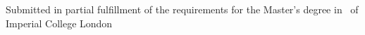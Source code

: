 \begin{titlepage}
\vfill %
Submitted in partial fulfillment of the requirements for the Master's degree in
\degreetype~of Imperial College London\\[0.5cm]

\makeatletter
\@date 
\makeatother


\end{titlepage}
